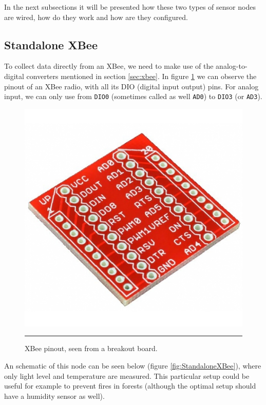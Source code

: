 In the next subsections it will be presented how these two types of sensor nodes are wired, how do they work and how are they configured.


\subsection{Standalone XBee}

To collect data directly from an XBee\textregistered{}, we need to make use of the analog-to-digital converters mentioned in section \ref{sec:xbee}. In figure \ref{fig:XBeeBO} we can observe the pinout of an XBee radio, with all its DIO (digital input output) pins. For analog input, we can only use from \texttt{DIO0} (sometimes called as well \texttt{AD0}) to \texttt{DIO3} (or \texttt{AD3})\cite{faludi2010building}.

\begin{figure}[htbp]
    \centering
        \includegraphics[scale=0.25]{./Figures/xbee_breakout.jpg}
        \rule{35em}{0.5pt}
    \caption[XBee pinout]{XBee pinout, seen from a breakout board.}
    \label{fig:XBeeBO}
\end{figure}

An schematic of this node can be seen below (figure \ref{fig:StandaloneXBee}), where only light level and temperature are measured. This particular setup could be useful for example to prevent fires in forests (although the optimal setup should have a humidity sensor as well).

